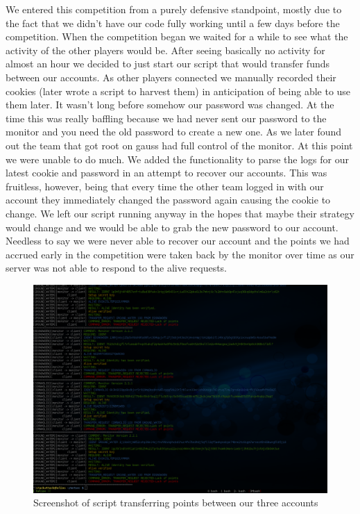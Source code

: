 \documentclass[10pt]{article}
\begin{document}
We entered this competition from a purely defensive standpoint, mostly due to
the fact that we didn't have our code fully working until a few days before the
competition. When the competition began we waited for a while to see what the
activity of the other players would be. After seeing basically no activity for
almost an hour we decided to just start our script that would transfer funds
between our accounts. As other players connected we manually recorded their
cookies (later wrote a script to harvest them) in anticipation of being able to
use them later. It wasn't long before somehow our password was changed. At the
time this was really baffling because we had never sent our password to the
monitor and you need the old password to create a new one. As we later found
out the team that got root on gauss had full control of the monitor. At this
point we were unable to do much. We added the functionality to parse the logs
for our latest cookie and password in an attempt to recover our accounts. This
was fruitless, however, being that every time the other team logged in with our
account they immediately changed the password again causing the cookie to
change.  We left our script running anyway in the hopes that maybe their
strategy would change and we would be able to grab the new password to our
account. Needless to say we were never able to recover our account and the
points we had accrued early in the competition were taken back by the monitor
over time as our server was not able to respond to the alive requests.

\vfill
\begin{figure}[H]
    \centering
    \includegraphics[width=\linewidth]{./log.png}
    \caption{Screenshot of script transferring points between our three accounts}
\end{figure}
\vfill
\end{document}
